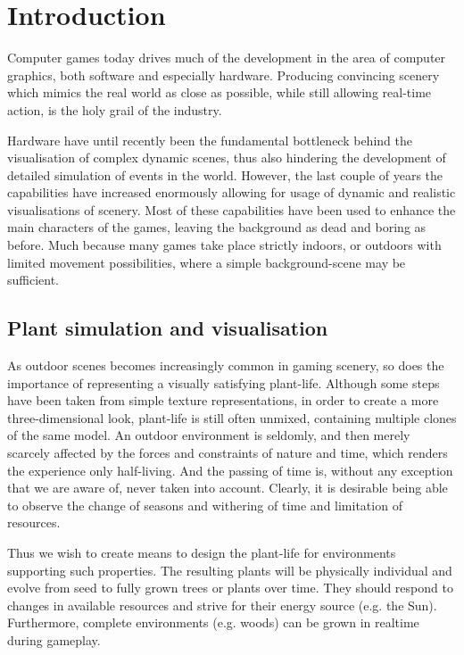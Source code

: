 
\section{Introduction}


    Computer games today drives much of the development in the
    area of computer graphics, both software and especially hardware.
    Producing convincing scenery which mimics the real world as close
    as possible, while still allowing real-time action, is the holy
    grail of the industry.

    Hardware have until recently been the fundamental bottleneck
    behind the visualisation of complex dynamic scenes, thus also
    hindering the development of detailed simulation of events in the
    world. However, the last couple of years the capabilities have
    increased enormously allowing for usage of dynamic and realistic
    visualisations of scenery. Most of these capabilities have been
    used to enhance the main characters of the games, leaving the
    background as dead and boring as before. Much because many games
    take place strictly indoors, or outdoors with limited movement
    possibilities, where a simple background-scene may be sufficient.


\subsection{Plant simulation and visualisation}

    As outdoor scenes becomes increasingly common in gaming scenery,
    so does the importance of representing a visually satisfying
    plant-life. Although some steps have been taken from simple
    texture representations, in order to create a more
    three-dimensional look, plant-life is still often unmixed,
    containing multiple clones of the same model. An outdoor
    environment is seldomly, and then merely scarcely affected by the
    forces and constraints of nature and time, which renders the
    experience only half-living. And the passing of time is, without
    any exception that we are aware of, never taken into account.
    Clearly, it is desirable being able to observe the change of
    seasons and withering of time and limitation of resources.

    Thus we wish to create means to design the plant-life for
    environments supporting such properties. The resulting plants will
    be physically individual and evolve from seed to fully grown trees
    or plants over time. They should respond to changes in available
    resources and strive for their energy source (e.g. the Sun).
    Furthermore, complete environments (e.g.  woods) can be grown in
    realtime during gameplay.


